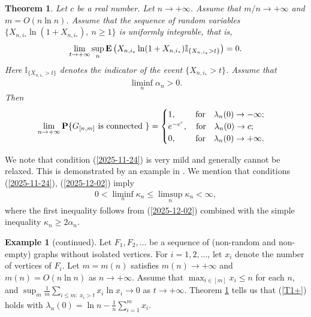 \documentclass[11pt, a4paper]{article}
\newcommand{\E}{{\bf{E}}}
\newcommand{\PP}{{\bf{P}}}
\newtheorem{tm}{Theorem}
\begin{document}
\begin{tm}\label{T1}
Let $c$ be a real number.
Let $n\to+\infty$. 
Assume that $m/n\to +\infty$ and $m=O(n\ln n)$. 
Assume that  the sequence of random variables $\{X_{n,i_*}\ln(1+X_{n,i_*}), \ n\ge 1\}$ is uniformly integrable, that is, 
\begin{align}
\label{2025-11-24}
\lim_{t\to+\infty}
\sup_{n}
\E\left(X_{n,i_*}\ln(1+X_{n,i_*})
{\mathbb I}_{\{X_{n,i_*}>t\}}\right)
=
0.
\end{align}
Here ${\mathbb I}_{\{X_{n,i_*}>t\}}$ denotes the indicator 
of the event $\{X_{n,i_*}>t\}$. Assume that 
\begin{align}
\label{2025-12-02}
\liminf_n\alpha_n>0.
\end{align}
Then 
\begin{equation}
\label{T1+}
\lim_{n\to+\infty}
\PP\{G_{[n,m]}{\rm{\ is \ connected \ }}\}
=
\begin{cases}
1,
\qquad 
\
{\rm{for}}
\quad \lambda_{n}(0)\to-\infty;
\\
e^{-e^c},
\quad 
{\rm{for}}
\quad \lambda_{n}(0)\to c;
\\
0,
\qquad 
\
{\rm{for}}
\quad \lambda_{n}(0)\to+\infty.
\end{cases}
\end{equation}
\end{tm}
\medskip
\noindent



We note that condition (\ref{2025-11-24}) 
is very mild and generally 
cannot be relaxed. This is demonstrated by an example 
in \cite{Daumilas_Mindaugas2023}.
We mention that
conditions (\ref{2025-11-24}), (\ref{2025-12-02}) imply  
\begin{align}
\label{2025-12-02+2}
0<\liminf_n\kappa_n\le \limsup_n\kappa_n<\infty,
\end{align}
where the first inequality  
follows 
from (\ref{2025-12-02})  combined with the simple 
inequality  $\kappa_n\ge 2\alpha_n$.

{\bf Example 1} (continued). Let $F_1,F_2,\dots$ be a sequence of (non-random and non-empty) graphs without isolated 
vertices. For $i=1,2,\dots$, let $x_i$  denote the number 
of vertices of $F_i$. 
Let $m=m(n)$  satisfies  $m(n)\to+\infty$  and  $m(n)=O(n\ln n)$ as $n\to+\infty$. Assume that   $\max_{i\in [m]}x_i\le n$ for each $n$, and 
$\sup_m\frac{1}{m}\sum_{i\le m: \ x_i>t}x_i\ln x_i\to 0$ as $t\to+\infty$. 
 Theorem \ref{T1} tells us that  (\ref{T1+}) holds with $\lambda_{n}(0)=\ln n-\frac{1}{n}\sum_{i=1}^mx_i$.
\end{document}
